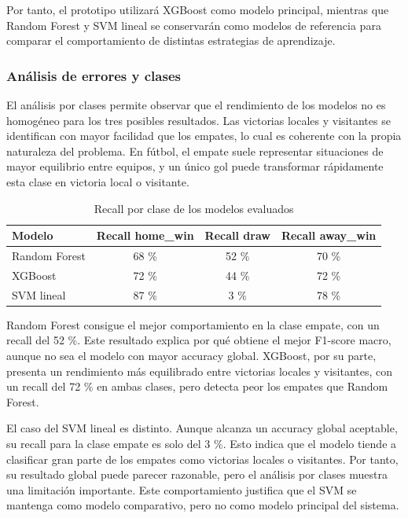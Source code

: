 Por tanto, el prototipo utilizará XGBoost como modelo principal, mientras que Random Forest y SVM lineal se conservarán como modelos de referencia para comparar el comportamiento de distintas estrategias de aprendizaje.

\subsubsection*{Análisis de errores y clases}

El análisis por clases permite observar que el rendimiento de los modelos no es homogéneo para los tres posibles resultados. Las victorias locales y visitantes se identifican con mayor facilidad que los empates, lo cual es coherente con la propia naturaleza del problema. En fútbol, el empate suele representar situaciones de mayor equilibrio entre equipos, y un único gol puede transformar rápidamente esta clase en victoria local o visitante.

\begin{table}[H]
    \centering
    \begin{tabular}{lccc}
        \hline
        \textbf{Modelo} & \textbf{Recall home\_win} & \textbf{Recall draw} & \textbf{Recall away\_win} \\
        \hline
        Random Forest   & 68 \%                     & 52 \%                & 70 \%                     \\
        XGBoost         & 72 \%                     & 44 \%                & 72 \%                     \\
        SVM lineal      & 87 \%                     & 3 \%                 & 78 \%                     \\
        \hline
    \end{tabular}
    \caption{Recall por clase de los modelos evaluados}
    \label{tab:recall_por_clase}
\end{table}

Random Forest consigue el mejor comportamiento en la clase empate, con un recall del 52 \%. Este resultado explica por qué obtiene el mejor F1-score macro, aunque no sea el modelo con mayor accuracy global. XGBoost, por su parte, presenta un rendimiento más equilibrado entre victorias locales y visitantes, con un recall del 72 \% en ambas clases, pero detecta peor los empates que Random Forest.

El caso del SVM lineal es distinto. Aunque alcanza un accuracy global aceptable, su recall para la clase empate es solo del 3 \%. Esto indica que el modelo tiende a clasificar gran parte de los empates como victorias locales o visitantes. Por tanto, su resultado global puede parecer razonable, pero el análisis por clases muestra una limitación importante. Este comportamiento justifica que el SVM se mantenga como modelo comparativo, pero no como modelo principal del sistema.


